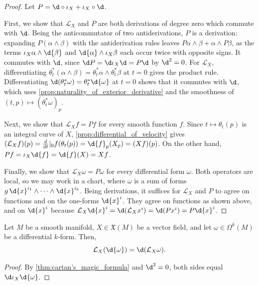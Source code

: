 \documentclass[a4paper,12pt]{article}
\begin{document}
\begin{proof}
    Let $P = \d \circ \iota_X + \iota_X \circ \d$.

    First, we show that $\mathcal{L}_X$ and $P$ are both derivations of degree zero which commute with $\d$.
    Being the anticommutator of two antiderivations, $P$ is a derivation: expanding $P(\alpha \wedge \beta)$ with the antiderivation rules leaves $P\alpha \wedge \beta + \alpha \wedge P\beta$, as the terms $\iota_X\alpha \wedge \d{\beta}$ and $\d{\alpha} \wedge \iota_X\beta$ each occur twice with opposite signs.
    It commutes with $\d$, since $\d P = \d \iota_X \d = P \d$ by $\d^2 = 0$.
    For $\mathcal{L}_X$, differentiating $\theta_t^*(\alpha \wedge \beta) = \theta_t^*\alpha \wedge \theta_t^*\beta$ at $t = 0$ gives the product rule.
    Differentiating $\d(\theta_t^*\omega) = \theta_t^*\d{\omega}$ at $t = 0$ shows that it commutes with $\d$, which uses \cref{prop:naturality_of_exterior_derivative} and the smoothness of $(t, p) \mapsto (\theta_t^*\omega)_p$.

    Next, we show that $\mathcal{L}_X f = Pf$ for every smooth function $f$.
    Since $t \mapsto \theta_t(p)$ is an integral curve of $X$, \cref{prop:differential_of_velocity} gives $(\mathcal{L}_X f)(p) = \eval*{\frac{d}{dt}}{0} f(\theta_t(p)) = \d{f}_p(X_p) = (Xf)(p)$.
    On the other hand, $Pf = \iota_X\d{f} = \d{f}(X) = Xf$.

    Finally, we show that $\mathcal{L}_X \omega = P\omega$ for every differential form $\omega$.
    Both operators are local, so we may work in a chart, where $\omega$ is a sum of forms $g \, \d{x}^{i_1} \wedge \cdots \wedge \d{x}^{i_k}$.
    Being derivations, it suffices for $\mathcal{L}_X$ and $P$ to agree on functions and on the one-forms $\d{x}^i$.
    They agree on functions as shown above, and on $\d{x}^i$ because $\mathcal{L}_X \d{x}^i = \d(\mathcal{L}_X x^i) = \d(P x^i) = P\d{x}^i$. \qedhere
\end{proof}
\begin{corollary}\label{cor:lie_derivative_commutes_with_exterior_derivative}
    Let $M$ be a smooth manifold, $X \in \mathfrak{X}(M)$ be a vector field, and let $\omega \in \Omega^k(M)$ be a differential $k$-form.
    Then,
    \begin{equation}
        \mathcal{L}_X(\d{\omega}) = \d(\mathcal{L}_X \omega).
    \end{equation}
\end{corollary}
\begin{proof}
    By \cref{thm:cartan's_magic_formula} and $\d^2 = 0$, both sides equal $\d \iota_X \d{\omega}$.
\end{proof}
\end{document}
